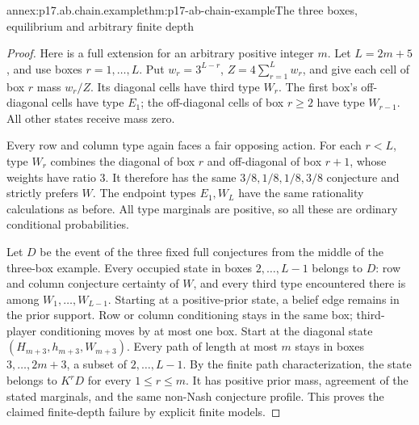 \begin{annexitem}{annex:p17.ab.chain.example}{thm:p17-ab-chain-example}{The three boxes, equilibrium and arbitrary finite depth}
\begin{proof}
Here is a full extension for an arbitrary positive integer \(m\).
Let \(L=2m+5\), and use boxes \(r=1,\ldots,L\).
Put \(w_r=3^{L-r}\), \(Z=4\sum_{r=1}^Lw_r\), and give
each cell of box \(r\) mass \(w_r/Z\).
Its diagonal cells have third type \(W_r\). The first
box's off-diagonal cells have type \(E_1\); the off-diagonal
cells of box \(r\geq2\) have type \(W_{r-1}\).
All other states receive mass zero.

Every row and column type again faces a fair opposing action.
For each \(r<L\), type \(W_r\) combines the diagonal of box
\(r\) and off-diagonal of box \(r+1\), whose weights have
ratio 3. It therefore has the same \(3/8,1/8,1/8,3/8\)
conjecture and strictly prefers \(W\). The endpoint types
\(E_1,W_L\) have the same rationality calculations as before.
All type marginals are positive, so all these are ordinary
conditional probabilities.

Let \(D\) be the event of the three fixed full conjectures
from the middle of the three-box example. Every occupied
state in boxes \(2,\ldots,L-1\) belongs to \(D\):
row and column conjecture certainty of \(W\), and every
third type encountered there is among \(W_1,\ldots,W_{L-1}\).
Starting at a positive-prior state, a belief edge remains
in the prior support. Row or column conditioning stays
in the same box; third-player conditioning moves by at
most one box. Start at the diagonal state
\((H_{m+3},h_{m+3},W_{m+3})\).
Every path of length at most \(m\) stays in boxes
\(3,\ldots,2m+3\), a subset of \(2,\ldots,L-1\).
By the finite path characterization, the state belongs
to \(K^rD\) for every \(1\leq r\leq m\).
It has positive prior mass, agreement of the stated marginals,
and the same non-Nash conjecture profile. This proves the
claimed finite-depth failure by explicit finite models.
\end{proof}
\end{annexitem}


